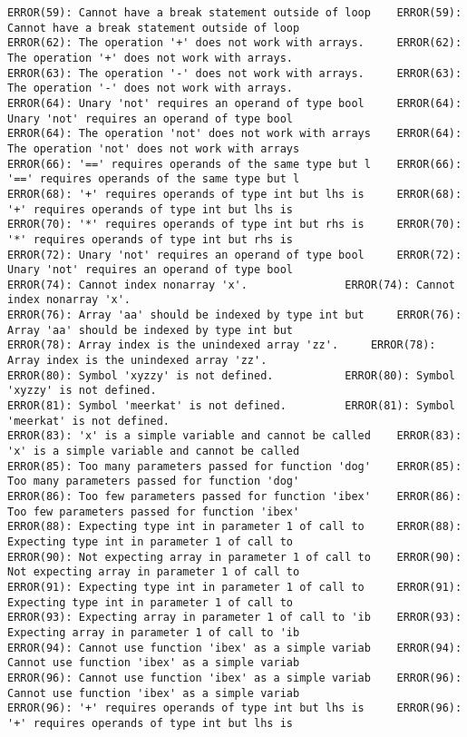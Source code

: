 \documentclass[12pt]{book}
\begin{document}
\begin{lstlisting}
ERROR(59): Cannot have a break statement outside of loop	ERROR(59): Cannot have a break statement outside of loop
ERROR(62): The operation '+' does not work with arrays.		ERROR(62): The operation '+' does not work with arrays.
ERROR(63): The operation '-' does not work with arrays.		ERROR(63): The operation '-' does not work with arrays.
ERROR(64): Unary 'not' requires an operand of type bool 	ERROR(64): Unary 'not' requires an operand of type bool 
ERROR(64): The operation 'not' does not work with arrays	ERROR(64): The operation 'not' does not work with arrays
ERROR(66): '==' requires operands of the same type but l	ERROR(66): '==' requires operands of the same type but l
ERROR(68): '+' requires operands of type int but lhs is 	ERROR(68): '+' requires operands of type int but lhs is 
ERROR(70): '*' requires operands of type int but rhs is 	ERROR(70): '*' requires operands of type int but rhs is 
ERROR(72): Unary 'not' requires an operand of type bool 	ERROR(72): Unary 'not' requires an operand of type bool 
ERROR(74): Cannot index nonarray 'x'.				ERROR(74): Cannot index nonarray 'x'.
ERROR(76): Array 'aa' should be indexed by type int but 	ERROR(76): Array 'aa' should be indexed by type int but 
ERROR(78): Array index is the unindexed array 'zz'.		ERROR(78): Array index is the unindexed array 'zz'.
ERROR(80): Symbol 'xyzzy' is not defined.			ERROR(80): Symbol 'xyzzy' is not defined.
ERROR(81): Symbol 'meerkat' is not defined.			ERROR(81): Symbol 'meerkat' is not defined.
ERROR(83): 'x' is a simple variable and cannot be called	ERROR(83): 'x' is a simple variable and cannot be called
ERROR(85): Too many parameters passed for function 'dog'	ERROR(85): Too many parameters passed for function 'dog'
ERROR(86): Too few parameters passed for function 'ibex'	ERROR(86): Too few parameters passed for function 'ibex'
ERROR(88): Expecting type int in parameter 1 of call to 	ERROR(88): Expecting type int in parameter 1 of call to 
ERROR(90): Not expecting array in parameter 1 of call to	ERROR(90): Not expecting array in parameter 1 of call to
ERROR(91): Expecting type int in parameter 1 of call to 	ERROR(91): Expecting type int in parameter 1 of call to 
ERROR(93): Expecting array in parameter 1 of call to 'ib	ERROR(93): Expecting array in parameter 1 of call to 'ib
ERROR(94): Cannot use function 'ibex' as a simple variab	ERROR(94): Cannot use function 'ibex' as a simple variab
ERROR(96): Cannot use function 'ibex' as a simple variab	ERROR(96): Cannot use function 'ibex' as a simple variab
ERROR(96): '+' requires operands of type int but lhs is 	ERROR(96): '+' requires operands of type int but lhs is 

\end{lstlisting}
\end{document}
